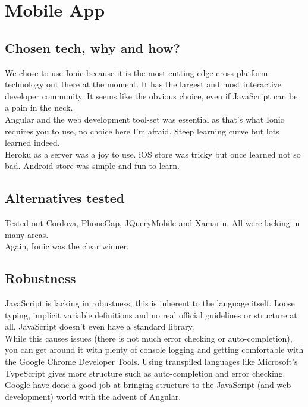 \section{Mobile App}
\subsection{Chosen tech, why and how?}
We chose to use Ionic because it is the most cutting edge cross platform technology out there at the moment.
It has the largest and most interactive developer community.
It seems like the obvious choice, even if JavaScript can be a pain in the neck.
\\

Angular and the web development tool-set was essential as that's what Ionic requires you to use, no choice here I'm afraid.
Steep learning curve but lots learned indeed.
\\

Heroku as a server was a joy to use.
iOS store was tricky but once learned not so bad.
Android store was simple and fun to learn.

\subsection{Alternatives tested}
Tested out Cordova, PhoneGap, JQueryMobile and Xamarin.
All were lacking in many areas.
\\

Again, Ionic was the clear winner.

\subsection{Robustness}
JavaScript is lacking in robustness, this is inherent to the language itself.
Loose typing, implicit variable definitions and no real official guidelines or structure at all.
JavaScript doesn't even have a standard library.
\\

While this causes issues (there is not much error checking or auto-completion), you can get around it with plenty of console logging and getting comfortable with the Google Chrome Developer Tools.
Using transpiled languages like Microsoft's TypeScript gives more structure such as auto-completion and error checking.
\\

Google have done a good job at bringing structure to the JavaScript (and web development) world with the advent of Angular.
\\

